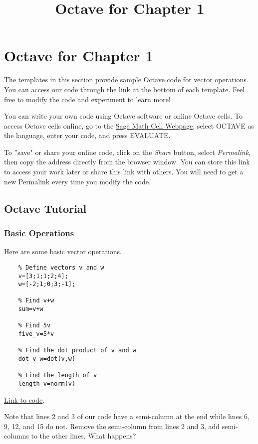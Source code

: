 \documentclass{ximera}
\title{Octave for Chapter 1} \license{CC BY-NC-SA 4.0}
\begin{document}
\begin{abstract}
\end{abstract}
\maketitle
\section*{Octave for Chapter 1}

The templates in this section provide sample Octave code for vector operations. You can access our code through the link at the bottom of each template.  Feel free to modify the code and experiment to learn more!  

You can write your own code using Octave software or online Octave cells.  To access Octave cells online, go to the \href{https://sagecell.sagemath.org/}{Sage Math Cell Webpage}, select OCTAVE as the language, enter your code, and press EVALUATE.  

To ''save" or share your online code, click on the \emph{Share} button, select \emph{Permalink}, then copy the address directly from the browser window.  You can store this link to access your work later or share this link with others.  You will need to get a new Permalink every time you modify the code.

\subsection*{Octave Tutorial}
\subsubsection*{Basic Operations}

\begin{template}\label{temp:vectorOps}
Here are some basic vector operations.
\begin{verbatim}
    % Define vectors v and w
    v=[3;1;1;2;4];
    w=[-2;1;0;3;-1]; 

    % Find v+w  
    sum=v+w

    % Find 5v
    five_v=5*v

    % Find the dot product of v and w
    dot_v_w=dot(v,w)

    % Find the length of v
    length_v=norm(v)
\end{verbatim}

\href{https://sagecell.sagemath.org/?z=eJxdTUEKwjAQvAfyh70UWrVgW3sKuYmfKBKkSWzAJpKmm--76sEie9idmZ2ZAs7GOm8AzZhCXADh5jVkzlAOnWhoWnG6Cs6yHOqW4FF0om7eDGcFXBx94z4DcLass6RzI_TImXVoFMp-hxshTQZ0SPCMQa9jgmB_xcQrVFnSLvGQqz_bw_h7mj4Ozr6A4n2Ic4nVCwQtO2M=&lang=octave&interacts=eJyLjgUAARUAuQ==}{Link to code}.

\begin{remark}
    Note that lines 2 and 3 of our code have a semi-column at the end while lines 6, 9, 12, and 15 do not.  Remove the semi-column from lines 2 and 3, add semi-columns to the other lines.  What happens?
\end{remark}
\end{template}
\end{document}
